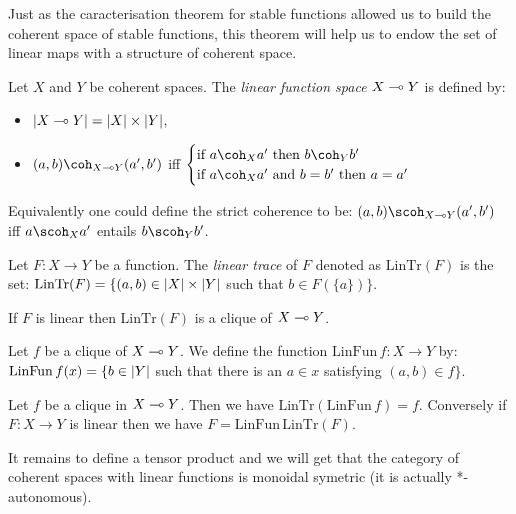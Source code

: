Just as the caracterisation theorem for stable functions allowed us to
build the coherent space of stable functions, this theorem will help us
to endow the set of linear maps with a structure of coherent space.

\begin{definition}
Let $X$ and $Y$ be coherent spaces. The \emph{linear function space} $X\multimap Y$ is defined by:
\begin{itemize}
\item $\left|X\multimap Y\right| = \left|X\right|\times \left|Y\right|$,
\item $(a,b)\coh_{X\limp Y}(a', b')$ iff $\begin{cases}\text{if }a\coh_X a'\text{ then } b\coh_Y b'\\
 \text{if }a\coh_X a' \text{ and }b=b'\text{ then }a=a'\end{cases}$
\end{itemize}
\end{definition}

Equivalently one could define the strict coherence to be:
\((a,b)\scoh_{X\limp Y}(a',b')\) iff \(a\scoh_X a'\) entails \(b\scoh_Y b'\).

\begin{definition}
Let $F:X\longrightarrow Y$ be a function. The \emph{linear trace} of $F$ denoted as $\mathrm{LinTr}(F)$ is the set:
  $\mathrm{LinTr}(F) = \{(a, b)\in\left|X\right|\times\left|Y\right|$ such that $b\in F(\{a\})\}$.
\end{definition}

\begin{theorem}
If $F$ is linear then $\mathrm{LinTr}(F)$ is a clique of $X\multimap Y$.
\end{theorem}

\begin{definition}
Let $f$ be a clique of $X\multimap Y$. We define the function $\mathrm{LinFun}\,f:X\longrightarrow Y$ by: $\mathrm{LinFun}\,f(x) = \{b\in\left|Y\right|$ such that there is an $a\in x$ satisfying $(a,b)\in f\}$.
\end{definition}

\begin{theorem}
Let $f$ be a clique in $X\multimap Y$. Then we have $\mathrm{LinTr}(\mathrm{LinFun}\, f) = f$. Conversely if $F:X\longrightarrow Y$ is linear then we have $F = \mathrm{LinFun}\,\mathrm{LinTr}(F)$.
\end{theorem}

It remains to define a tensor product and we will get that the category
of coherent spaces with linear functions is monoidal symetric (it is
actually *-autonomous).

